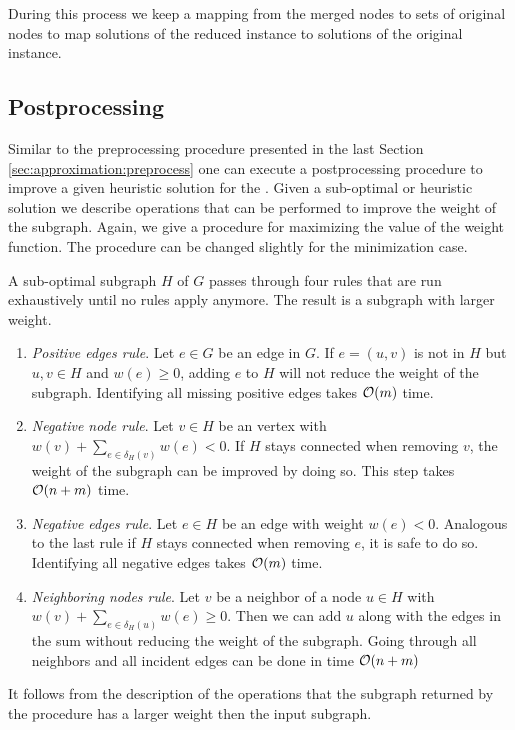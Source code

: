 During this process we keep a mapping from the merged nodes to sets of original nodes to map solutions of the reduced instance to solutions of the original instance.


\subsection{Postprocessing}
\label{sec:approximation:postprocess}

Similar to the preprocessing procedure presented in the last Section \ref{sec:approximation:preprocess} one can execute a postprocessing procedure to improve a given heuristic solution for the \WSP. Given a sub-optimal or heuristic solution we describe operations that can be performed to improve the weight of the subgraph. Again, we give a procedure for maximizing the value of the weight function. The procedure can be changed slightly for the minimization case.\medskip

A sub-optimal subgraph $H$ of $G$ passes through four rules that are run exhaustively until no rules apply anymore. The result is a subgraph with larger weight.

\begin{enumerate}
	\item \textit{Positive edges rule}. Let $e \in G$ be an edge in $G$. If $e = (u, v)$ is not in $H$ but $u, v \in H$ and $w(e) \geq 0$, adding $e$ to $H$ will not reduce the weight of the subgraph. Identifying all missing positive edges takes $\mathcal{O}(m)$ time.
	\item \textit{Negative node rule}. Let $v \in H$ be an vertex with $w(v) + \sum_{e \in \delta_H(v)} w(e) < 0$. If $H$ stays connected when removing $v$, the weight of the subgraph can be improved by doing so. This step takes $\mathcal{O}(n + m)$ time.
	\item \textit{Negative edges rule}. Let $e \in H$ be an edge with weight $w(e) < 0$. Analogous to the last rule if $H$ stays connected when removing $e$, it is safe to do so. Identifying all negative edges takes $\mathcal{O}(m)$ time.	
	\item \textit{Neighboring nodes rule}. Let $v$ be a neighbor of a node $u \in H$ with $w(v) + \sum_{e \in \delta_H(u)} w(e) \geq 0$. Then we can add $u$ along with the edges in the sum without reducing the weight of the subgraph. Going through all neighbors and all incident edges can be done in time $\mathcal{O}(n+m)$
\end{enumerate}

It follows from the description of the operations that the subgraph returned by the procedure has a larger weight then the input subgraph.


